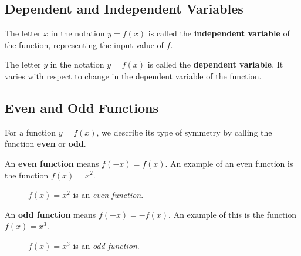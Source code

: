 \subsection{Dependent and Independent Variables}
  The letter \(x\) in the notation \(y=f(x)\) is called the \textbf{independent variable} of the function, representing the input value of \(f\).

  The letter \(y\) in the notation \(y=f(x)\) is called the \textbf{dependent variable}.
  It varies with respect to change in the dependent variable of the function.

\subsection{Even and Odd Functions}

For a function $y=f(x)$, we describe its type of symmetry by calling the function \textbf{even} or \textbf{odd}.

An \textbf{even function} means $f(-x)=f(x)$.
An example of an even function is the function $f(x)=x^2$.
  \begin{figure}[H]
    \begin{center}
    \end{center}
    \caption{$f(x)=x^2$ is an \emph{even function}.}
  \end{figure}
  An \textbf{odd function} means $f(-x)=-f(x)$. An example of this is the function $f(x)=x^3$.
  \begin{figure}[H]
    \begin{center}
    \end{center}
    \caption{$f(x)=x^3$ is an \emph{odd function}.}
  \end{figure}
